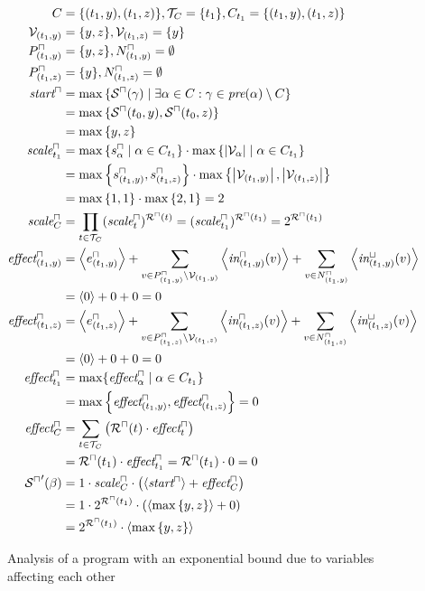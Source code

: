 \begin{figure}
\begin{align*}
  C &= \lbrace (t_1,y), (t_1,z) \rbrace, \mathcal{T}_C = \lbrace t_1 \rbrace, C_{t_1} = \lbrace (t_1,y), (t_1,z) \rbrace \\
  \mathcal{V}_{(t_1,y)} &= \lbrace y,z \rbrace, \mathcal{V}_{(t_1,z)} = \lbrace y \rbrace \\
  P^\sqcap_{(t_1,y)} &= \lbrace y,z \rbrace, N^\sqcap_{(t_1,y)} = \emptyset \\
  P^\sqcap_{(t_1,z)} &= \lbrace y \rbrace, N^\sqcap_{(t_1,z)} = \emptyset \\
  \emph{start}^\sqcap &= \max \left\lbrace {\mathcal{S}^\sqcap}(\gamma) \mid \exists \alpha \in C: \gamma \in \emph{pre}(\alpha) \setminus C \right\rbrace \\
  &= \max \left\lbrace {\mathcal{S}^\sqcap}(t_0,y), {\mathcal{S}^\sqcap}(t_0,z) \right\rbrace \\
  &= \max \left\lbrace y,z \right\rbrace \\
  \emph{scale}^\sqcap_{t_1} &= \max \left\lbrace s^\sqcap_\alpha \mid \alpha \in C_{t_1} \right\rbrace \cdot \max \left\lbrace \left|\mathcal{V}_\alpha\right| \mid \alpha \in C_{t_1} \right\rbrace \\
  &= \max \left\lbrace s^\sqcap_{(t_1,y)}, s^\sqcap_{(t_1,z)} \right\rbrace \cdot \max \left\lbrace \left|\mathcal{V}_{(t_1,y)}\right|, \left|\mathcal{V}_{(t_1,z)}\right| \right\rbrace \\
  &= \max \left\lbrace 1,1 \right\rbrace \cdot \max \left\lbrace 2,1 \right\rbrace = 2 \\
  \emph{scale}^\sqcap_C &= \prod_{t \in \mathcal{T}_C} (\emph{scale}^\sqcap_t)^{{\mathcal{R}^\sqcap}(t)} = (\emph{scale}^\sqcap_{t_1})^{{\mathcal{R}^\sqcap}(t_1)} = 2^{{\mathcal{R}^\sqcap}(t_1)} \\
  \emph{effect}^\sqcap_{(t_1,y)} &= \left\langle e^{\sqcap}_{(t_1,y)} \right\rangle + \sum_{v \in P_{(t_1,y)}^\sqcap \setminus \mathcal{V}_{(t_1,y)}} \left\langle \emph{in}^\sqcap_{(t_1,y)}(v) \right\rangle + \sum_{v \in N_{(t_1,y)}^\sqcap} \left\langle \emph{in}^\sqcup_{(t_1,y)}(v) \right\rangle \\
  &= \left\langle 0 \right\rangle + 0 + 0 = 0 \\
  \emph{effect}^\sqcap_{(t_1,z)} &= \left\langle e^{\sqcap}_{(t_1,z)} \right\rangle + \sum_{v \in P_{(t_1,z)}^\sqcap \setminus \mathcal{V}_{(t_1,z)}} \left\langle \emph{in}^\sqcap_{(t_1,z)}(v) \right\rangle + \sum_{v \in N_{(t_1,z)}^\sqcap} \left\langle \emph{in}^\sqcup_{(t_1,z)}(v) \right\rangle \\
  &= \left\langle 0 \right\rangle + 0 + 0 = 0 \\
  \emph{effect}^\sqcap_{t_1} &= \max \lbrace \emph{effect}^\sqcap_\alpha \mid \alpha \in C_{t_1}  \rbrace \\
  &= \max \left\lbrace \emph{effect}^\sqcap_{(t_1,y)}, \emph{effect}^\sqcap_{(t_1,z)} \right\rbrace = 0 \\
  \emph{effect}^\sqcap_C &= \sum_{t \in \mathcal{T}_C} \left( {\mathcal{R}^\sqcap}(t) \cdot \emph{effect}^\sqcap_t \right) \\
  &= {\mathcal{R}^\sqcap}(t_1) \cdot \emph{effect}^\sqcap_{t_1} = {\mathcal{R}^\sqcap}(t_1) \cdot 0 = 0 \\
  {\mathcal{S}^\sqcap}'(\beta) &= 1 \cdot \emph{scale}^\sqcap_C \cdot \left( \left\langle \emph{start}^\sqcap \right\rangle + \emph{effect}^\sqcap_C \right) \\
  &= 1 \cdot 2^{{\mathcal{R}^\sqcap}(t_1)} \cdot \left( \left\langle \max \left\lbrace y,z \right\rbrace \right\rangle + 0 \right) \\
  &= 2^{{\mathcal{R}^\sqcap}(t_1)} \cdot \left\langle \max \left\lbrace y,z \right\rbrace \right\rangle
\end{align*}

\caption{Analysis of a program with an exponential bound due to variables affecting each other}
\label{fig:exp_with_vars}
\end{figure}

